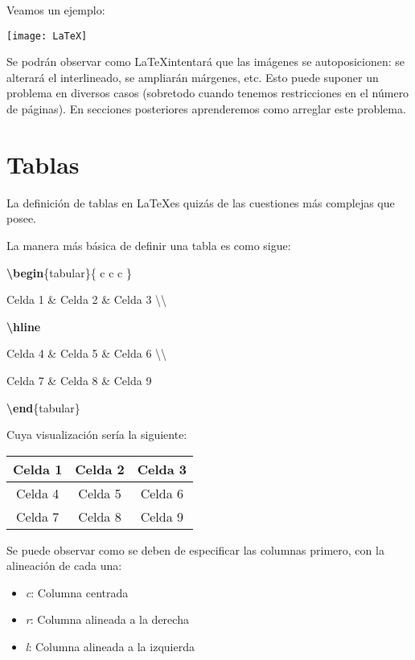 Veamos un ejemplo: %

\texttt{[image: LaTeX]}

Se podrán observar como \LaTeX intentará que las imágenes se autoposicionen: se alterará el interlineado, se ampliarán márgenes, etc. Esto puede suponer un problema en diversos casos (sobretodo cuando tenemos restricciones en el número de páginas). En secciones posteriores aprenderemos como arreglar este problema.

\section{Tablas}

La definición de tablas en \LaTeX es quizás de las cuestiones más complejas que posee.

La manera más básica de definir una tabla es como sigue:

\textbf{\textbackslash begin}\{tabular\}\{ c \vline c \vline c \}

 Celda 1 \& Celda 2 \& Celda 3 \textbackslash\textbackslash
 
 \textbf{\textbackslash hline}
 
 Celda 4 \& Celda 5 \& Celda 6 \textbackslash\textbackslash
 
 Celda 7 \& Celda 8 \& Celda 9
  
\textbf{\textbackslash end}\{tabular\}

Cuya visualización sería la siguiente: %

\begin{tabular}{ c|c|c }
 Celda 1 & Celda 2 & Celda 3 \\
 \hline
 Celda 4 & Celda 5 & Celda 6 \\  
 Celda 7 & Celda 8 & Celda 9    
\end{tabular}

Se puede observar como se deben de especificar las columnas primero, con la alineación de cada una:

\begin{itemize}
	\item \emph{c}: Columna centrada
	\item \emph{r}: Columna alineada a la derecha
	\item \emph{l}: Columna alineada a la izquierda
\end{itemize}

